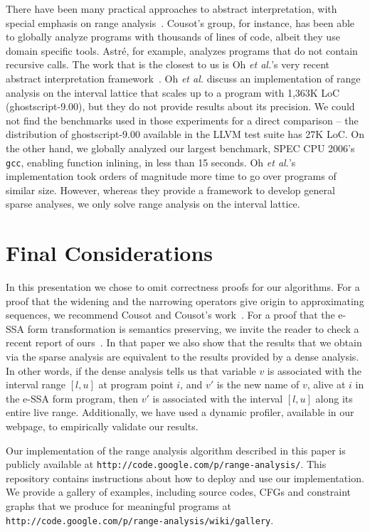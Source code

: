 \documentclass[times]{speauth}
\begin{document}
There have been many practical approaches to abstract interpretation,
with special emphasis on range analysis~\cite{Bertrane10,Blanchet03,Cousot09,Gampe11,Jung05}.
Cousot's group, for instance, has been able to globally analyze programs with
thousands of lines of code, albeit they use domain specific tools.
Astr\'{e}, for example, analyzes programs that do not contain recursive calls.
The work that is the closest to us is Oh {\em et al.}'s very recent abstract
interpretation framework~\cite{Oh12}.
Oh {\em et al.} discuss an implementation of range analysis on the interval
lattice that scales up to a program with 1,363K LoC (ghostscript-9.00), but
they do not provide results about its precision.
We could not find the benchmarks used in those experiments for a
direct comparison -- the distribution of ghostscript-9.00 available in the
LLVM test suite has 27K LoC.
On the other hand, we globally analyzed our largest benchmark, SPEC CPU 2006's
\texttt{gcc}, enabling function inlining, in less than 15 seconds.
Oh {\em et al.}'s implementation took orders of magnitude more time to go over
programs of similar size.
However, whereas they provide a framework to develop general sparse analyses, we
only solve range analysis on the interval lattice.

\section{Final Considerations}
\label{sec:con}

In this presentation we chose to omit correctness proofs for our algorithms.
For a proof that the widening and the narrowing operators give origin to
approximating sequences, we recommend Cousot and Cousot's work~\cite{Cousot77}.
For a proof that the e-SSA form transformation is semantics preserving, we
invite the reader to check a recent report of ours~\cite{Tavares11b}.
In that paper we also show that the results that we obtain via the
sparse analysis are equivalent to the results provided by a dense analysis.
In other words, if the dense analysis tells us that variable $v$ is
associated with the interval range $[l, u]$ at program point $i$, and $v'$
is the new name of $v$, alive at $i$ in the e-SSA form program, then $v'$ is
associated with the interval $[l, u]$ along its entire live range.
Additionally, we have used a dynamic profiler, available in our webpage, to
empirically validate our results.

Our implementation of the range analysis algorithm described in this paper is
publicly available at \texttt{http://code.google.com/p/range-analysis/}.
This repository contains instructions about how to deploy and use our
implementation.
We provide a gallery of examples, including source codes,
CFGs and constraint graphs that we produce for meaningful programs at
\texttt{http://code.google.com/p/range-analysis/wiki/gallery}.



\end{document}
